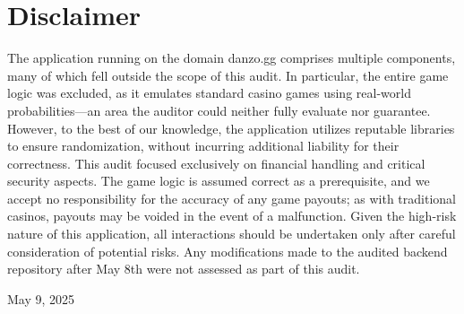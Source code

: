 \documentclass[11pt,a4paper]{article}
\begin{document}
\section{Disclaimer}

The application running on the domain danzo.gg comprises multiple components, many of which fell outside the scope of this audit. In particular, the entire game logic was excluded, as it emulates standard casino games using real-world probabilities—an area the auditor could neither fully evaluate nor guarantee. However, to the best of our knowledge, the application utilizes reputable libraries to ensure randomization, without incurring additional liability for their correctness. This audit focused exclusively on financial handling and critical security aspects. The game logic is assumed correct as a prerequisite, and we accept no responsibility for the accuracy of any game payouts; as with traditional casinos, payouts may be voided in the event of a malfunction. Given the high-risk nature of this application, all interactions should be undertaken only after careful consideration of potential risks. Any modifications made to the audited backend repository after May 8th were not assessed as part of this audit.

\vspace{2cm}

\noindent May 9, 2025
\end{document}
